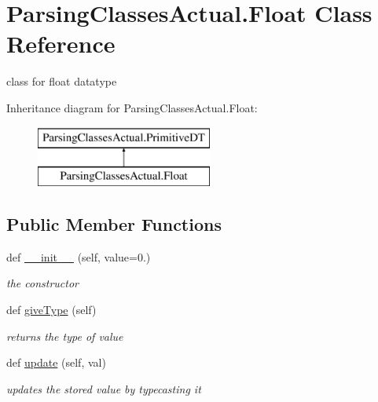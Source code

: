 \hypertarget{class_parsing_classes_actual_1_1_float}{}\section{Parsing\+Classes\+Actual.\+Float Class Reference}
\label{class_parsing_classes_actual_1_1_float}


class for float datatype  


Inheritance diagram for Parsing\+Classes\+Actual.\+Float\+:\begin{figure}[H]
\begin{center}
\leavevmode
\includegraphics[height=2.000000cm]{class_parsing_classes_actual_1_1_float}
\end{center}
\end{figure}
\subsection*{Public Member Functions}
\begin{DoxyCompactItemize}
\item 
def \hyperlink{class_parsing_classes_actual_1_1_float_a285387447fcf577d0ef3b1f3f8f4e69b}{\+\_\+\+\_\+init\+\_\+\+\_\+} (self, value=0.)
\begin{DoxyCompactList}\small\item\em the constructor \end{DoxyCompactList}\item 
\mbox{\label{class_parsing_classes_actual_1_1_float_ae424695b61f25088e1378a672da9036c}} 
def \hyperlink{class_parsing_classes_actual_1_1_float_ae424695b61f25088e1378a672da9036c}{give\+Type} (self)
\begin{DoxyCompactList}\small\item\em returns the type of value \end{DoxyCompactList}\item 
\mbox{\label{class_parsing_classes_actual_1_1_float_a87739feda988d226bb1e384b31cbc113}} 
def \hyperlink{class_parsing_classes_actual_1_1_float_a87739feda988d226bb1e384b31cbc113}{update} (self, val)
\begin{DoxyCompactList}\small\item\em updates the stored value by typecasting it \end{DoxyCompactList}\end{DoxyCompactItemize}
